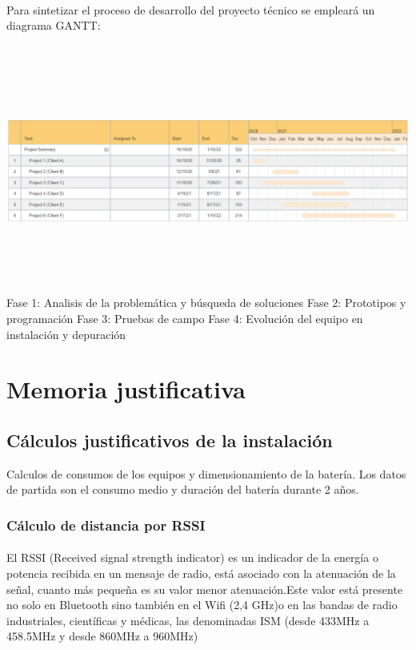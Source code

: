 \documentclass[a4paper ,12pt, onecolumn]{article}
\begin{document}
        \paragraph{}
        Para sintetizar el proceso de desarrollo del proyecto técnico se empleará un diagrama GANTT: 
        \paragraph{}
        \includegraphics[width=15cm, height=8cm]{gantt.PNG}
        Fase 1: Analisis de la problemática y búsqueda de soluciones
        Fase 2: Prototipos y programación
        Fase 3: Pruebas de campo
        Fase 4: Evolución del equipo en instalación y depuración 
\section{Memoria justificativa}
    \subsection{Cálculos justificativos de la instalación}
        Calculos de consumos de los equipos y dimensionamiento de la batería.
        Los datos de partida son el consumo medio y duración del batería durante 2 años.
        \subsubsection{Cálculo de distancia por RSSI}
                \paragraph{}
                El RSSI (Received signal strength indicator) es un indicador de la energía o potencia recibida en un mensaje de radio, 
                está asociado con la atenuación de la señal, cuanto más pequeña es su valor menor atenuación.Este valor está 
                presente no solo en Bluetooth sino también en el Wifi (2,4 GHz)o en las bandas de radio industriales, científicas y médicas,
                las denominadas ISM (desde 433MHz a 458.5MHz y desde 860MHz a 960MHz)
\end{document}

